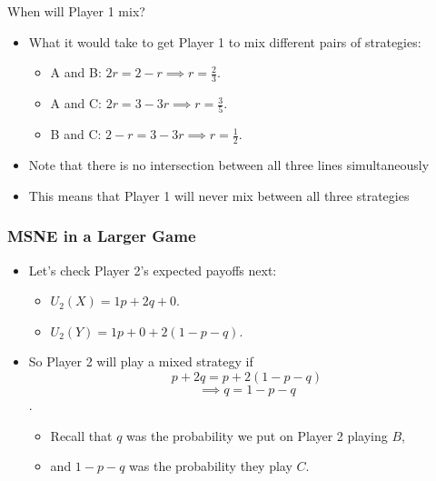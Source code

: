 
\begin{frame}{When will Player 1 mix?}
  \begin{itemize}
    \item What it would take to get Player 1 to mix different pairs of strategies:
	\begin{itemize}
		\item A and B: $2r = 2 - r \implies r = \frac{2}{3}$.
		\item A and C: $2r = 3 - 3r \implies r = \frac{3}{5}$.
		\item B and C: $2 - r = 3 - 3r \implies r = \frac{1}{2}$.
	\end{itemize}

    \item Note that there is no intersection between all three lines simultaneously

    \item This means that Player 1 will never mix between all three strategies
  \end{itemize}
\end{frame}


\begin{frame}
\frametitle{MSNE in a Larger Game}
\begin{itemize}
	\item Let's check Player 2's expected payoffs next:
	\begin{itemize}
		\item $U_2(X) = 1p + 2q + 0$.
		\item $U_2(Y) = 1p + 0 + 2(1 - p - q)$.
	\end{itemize}
	\item So Player 2 will play a mixed strategy if
  $$p + 2q = p + 2(1 - p - q)$$ 
  $$\implies q = 1 - p - q$$.

  \begin{itemize}
    \item Recall that $q$ was the probability we put on Player 2 playing $B$,
    \item and $1-p-q$ was the probability they play $C$. 
  \end{itemize}

\end{itemize}
\end{frame}



